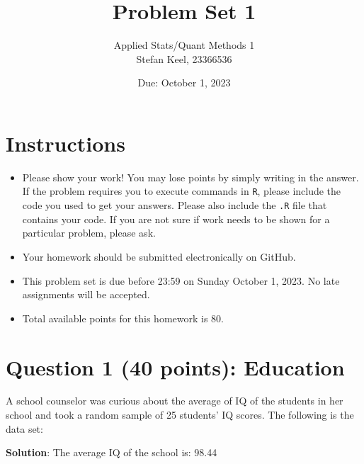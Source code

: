\documentclass[12pt,letterpaper]{article}
\title{Problem Set 1}
\date{Due: October 1, 2023}
\author{Applied Stats/Quant Methods 1 \\ Stefan Keel, 23366536}
\begin{document}
	\maketitle
	
	\section*{Instructions}
	\begin{itemize}
	\item Please show your work! You may lose points by simply writing in the answer. If the problem requires you to execute commands in \texttt{R}, please include the code you used to get your answers. Please also include the \texttt{.R} file that contains your code. If you are not sure if work needs to be shown for a particular problem, please ask.
\item Your homework should be submitted electronically on GitHub.
\item This problem set is due before 23:59 on Sunday October 1, 2023. No late assignments will be accepted.
\item Total available points for this homework is 80.
	\end{itemize}
	
	\vspace{1cm}
	\section*{Question 1 (40 points): Education}

A school counselor was curious about the average of IQ of the students in her school and took a random sample of 25 students' IQ scores. The following is the data set:\\
\vspace{.5cm}

  

\textbf{Solution}: The average IQ of the school is: 98.44 

\vspace{1cm}
\end{document}
